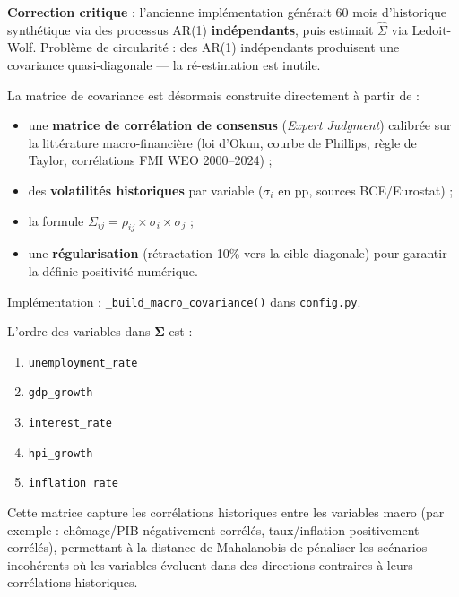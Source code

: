 \documentclass[12pt,a4paper]{article}
\begin{document}
\begin{warningbox}
\textbf{Correction critique} : l'ancienne impl\'ementation g\'en\'erait 60 mois d'historique
synth\'etique via des processus AR(1) \textbf{ind\'ependants}, puis estimait $\hat{\Sigma}$
via Ledoit-Wolf. Probl\`eme de circularit\'e : des AR(1) ind\'ependants produisent une
covariance quasi-diagonale --- la r\'e-estimation est inutile.

La matrice de covariance est d\'esormais construite directement \`a partir de :
\begin{itemize}[nosep]
    \item une \textbf{matrice de corr\'elation de consensus} (\textit{Expert Judgment})
          calibr\'ee sur la litt\'erature macro-financi\`ere (loi d'Okun, courbe de Phillips,
          r\`egle de Taylor, corr\'elations FMI WEO 2000--2024) ;
    \item des \textbf{volatilit\'es historiques} par variable ($\sigma_i$ en pp, sources BCE/Eurostat) ;
    \item la formule $\Sigma_{ij} = \rho_{ij} \times \sigma_i \times \sigma_j$ ;
    \item une \textbf{r\'egularisation} (r\'etractation 10\% vers la cible diagonale)
          pour garantir la d\'efinie-positivit\'e num\'erique.
\end{itemize}
Impl\'ementation : \texttt{\_build\_macro\_covariance()} dans \texttt{config.py}.
\end{warningbox}

L'ordre des variables dans $\boldsymbol{\Sigma}$ est :

\begin{enumerate}[nosep]
    \item \texttt{unemployment\_rate}
    \item \texttt{gdp\_growth}
    \item \texttt{interest\_rate}
    \item \texttt{hpi\_growth}
    \item \texttt{inflation\_rate}
\end{enumerate}

Cette matrice capture les corr\'elations historiques entre les variables macro
(par exemple : ch\^omage/PIB n\'egativement corr\'el\'es, taux/inflation positivement
corr\'el\'es), permettant \`a la distance de Mahalanobis de p\'enaliser les sc\'enarios
incoh\'erents o\`u les variables \'evoluent dans des directions contraires \`a leurs
corr\'elations historiques.
\end{document}
